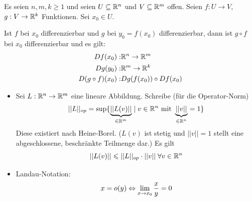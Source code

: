 \documentclass[main.tex]{subfiles}
\begin{document}
\begin{Theorem}[Kettenregel]
  Es seien $n, m, k \geq 1$ und seien $U \subseteq \mathbb{R}^n$ und $V \subseteq \mathbb{R}^m$ offen. Seien $f: U \to V$, $g: V \to \mathbb{R}^k$ Funktionen. Sei $x_0 \in U$.

  Ist $f$ bei $x_0$ differenzierbar und $g$ bei $y_0 = f(x_0)$ differenzierbar, dann ist $g \circ f$ bei $x_0$ differenzierbar und es gilt:
  $$\begin{aligned}
    D f(x_0) : & \mathbb{R}^n \to \mathbb{R}^m  \\
    D g(y_0) : & \mathbb{R}^m \to \mathbb{R}^k \\
    D(g \circ f)(x_0) : & D g (f(x_0)) \circ D f(x_0)
  \end{aligned}$$
\end{Theorem}
\begin{Bemerkung}[Erinnerung]
  \begin{itemize}
    \item Sei $L: \mathbb{R}^n \to \mathbb{R}^m$ eine lineare Abbildung. Schreibe (für die Operator-Norm)
      $$||L||_{op} = \sup \{ \underbrace{||L(v)||}_{ \in \mathbb{R}^m} \mid v \in \mathbb{R}^n \text{ mit } \underbrace{||v||}_{ \in \mathbb{R}^n} = 1 \}$$
      Diese existiert nach Heine-Borel. ($L(v)$ ist stetig und $||v||=1$ stellt eine abgeschlossene, beschränkte Teilmenge dar.) Es gilt
      $$||L(v)|| \leqslant ||L||_{op} \cdot ||v|| \;\forall v \in \mathbb{R}^n$$
    \item Landau-Notation:
    $$x = o(y) \Leftrightarrow \lim \limits_{x \to x_0} \dfrac{x}{y} = 0$$
  \end{itemize}

\end{Bemerkung}
\end{document}
